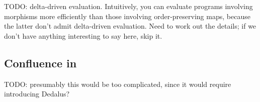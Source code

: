 TODO: delta-driven evaluation. Intuitively, you can evaluate programs involving
morphisms more efficiently than those involving order-preserving maps, because
the latter don't admit delta-driven evaluation. Need to work out the details; if
we don't have anything interesting to say here, skip it.

\subsection{Confluence in \baselang}

TODO: presumably this would be too complicated, since it would require
introducing Dedalus?
